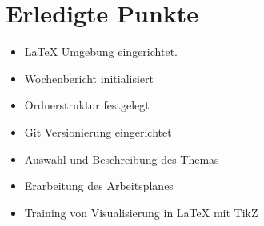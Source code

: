 \section{Erledigte Punkte}

\begin{itemize}
  \item \LaTeX{} Umgebung eingerichtet.
  \item Wochenbericht initialisiert
  \item Ordnerstruktur festgelegt
  \item Git Versionierung eingerichtet
  \item Auswahl und Beschreibung des Themas
  \item Erarbeitung des Arbeitsplanes
  \item Training von Visualisierung in \LaTeX{} mit TikZ
\end{itemize}

